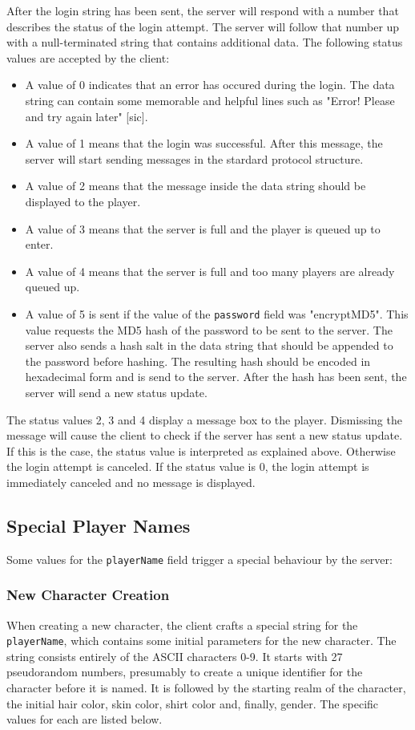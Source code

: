 \documentclass{article}
\newcommand{\field}[1]{\textcolor{fieldColor}{\texttt{#1}}}
\begin{document}
After the login string has been sent, the server will respond with a number that describes the status of the login attempt. The server will follow that number up with a null-terminated string that contains additional
data. The following status values are accepted by the client:

\begin{itemize}
\item A value of 0 indicates that an error has occured during the login. The data string can contain some memorable and helpful lines such as "Error! Please and try again later" [sic].
\item A value of 1 means that the login was successful. After this message, the server will start sending messages in the stardard protocol structure.
\item A value of 2 means that the message inside the data string should be displayed to the player.
\item A value of 3 means that the server is full and the player is queued up to enter.
\item A value of 4 means that the server is full and too many players are already queued up.
\item A value of 5 is sent if the value of the \field{password} field was "encryptMD5". This value requests the MD5 hash of the password to be sent to the server. The server also sends a hash salt in the data string
that should be appended to the password before hashing. The resulting hash should be encoded in hexadecimal form and is send to the server. After the hash has been sent, the server will send a new status update.
\end{itemize}

The status values 2, 3 and 4 display a message box to the player. Dismissing the message will cause the client to check if the server has sent a new status update. If this is the case, the status value is interpreted
as explained above. Otherwise the login attempt is canceled. If the status value is 0, the login attempt is immediately canceled and no message is displayed.

\subsection{Special Player Names}
Some values for the \field{playerName} field trigger a special behaviour by the server:

\subsubsection{New Character Creation}
When creating a new character, the client crafts a special string for the \field{playerName}, which contains some initial parameters for the new character. The string consists entirely of the ASCII characters
0-9. It starts with 27 pseudorandom numbers, presumably to create a unique identifier for the character before it is named. It is followed by the starting realm of the character, the initial hair color,
skin color, shirt color and, finally, gender. The specific values for each are listed below.
\end{document}

